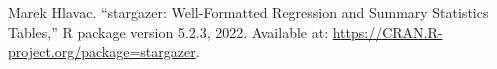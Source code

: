 \begin{thebibliography}{99} %
  Marek Hlavac. 
  ``stargazer: Well-Formatted Regression and Summary Statistics Tables,'' 
  R package version 5.2.3, 2022. 
  Available at: \url{https://CRAN.R-project.org/package=stargazer}.

\end{thebibliography}